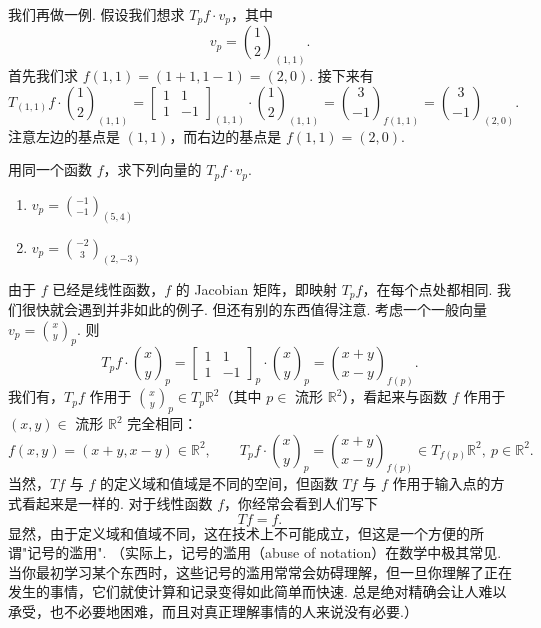 我们再做一例. 假设我们想求 $T_pf\cdot v_p$，其中
\[
v_p=\binom{1}{2}_{(1,1)}.
\]
首先我们求 $f(1,1)=(1+1,1-1)=(2,0)$. 接下来有
\[
T_{(1,1)}f\cdot\binom{1}{2}_{(1,1)}
=
\begin{bmatrix}
1&1\\
1&-1
\end{bmatrix}_{(1,1)}
\cdot\binom{1}{2}_{(1,1)}
=
\binom{3}{-1}_{f(1,1)}
=
\binom{3}{-1}_{(2,0)}.
\]
注意左边的基点是 $(1,1)$，而右边的基点是 $f(1,1)=(2,0)$.

\begin{question}\label{q:6-4}
用同一个函数 $f$，求下列向量的 $T_pf\cdot v_p$.
\begin{enumerate}
  \item[(a)] $v_p=\binom{-1}{-1}_{(5,4)}$
  \item[(b)] $v_p=\binom{-2}{3}_{(2,-3)}$
\end{enumerate}
\end{question}

由于 $f$ 已经是线性函数，$f$ 的 Jacobian 矩阵，即映射 $T_pf$，在每个点处都相同. 我们很快就会遇到并非如此的例子. 但还有别的东西值得注意. 考虑一个一般向量 $v_p=\binom{x}{y}_p$. 则
\[
T_pf\cdot\binom{x}{y}_p
=
\begin{bmatrix}
1&1\\
1&-1
\end{bmatrix}_p
\cdot\binom{x}{y}_p
=
\binom{x+y}{x-y}_{f(p)}.
\]
我们有，$T_pf$ 作用于 $\binom{x}{y}_p\in T_p\mathbb{R}^2$（其中 $p\in$ 流形 $\mathbb{R}^2$），看起来与函数 $f$ 作用于 $(x,y)\in$ 流形 $\mathbb{R}^2$ 完全相同：
\[
f(x,y)=(x+y,x-y)\in\mathbb{R}^2,\qquad
T_pf\cdot\binom{x}{y}_p=\binom{x+y}{x-y}_{f(p)}\in T_{f(p)}\mathbb{R}^2,\ p\in\mathbb{R}^2.
\]
当然，$Tf$ 与 $f$ 的定义域和值域是不同的空间，但函数 $Tf$ 与 $f$ 作用于输入点的方式看起来是一样的. 对于线性函数 $f$，你经常会看到人们写下
\[
Tf=f.
\]
显然，由于定义域和值域不同，这在技术上不可能成立，但这是一个方便的所谓"记号的滥用". （实际上，记号的滥用（abuse of notation）在数学中极其常见. 当你最初学习某个东西时，这些记号的滥用常常会妨碍理解，但一旦你理解了正在发生的事情，它们就使计算和记录变得如此简单而快速. 总是绝对精确会让人难以承受，也不必要地困难，而且对真正理解事情的人来说没有必要.）

